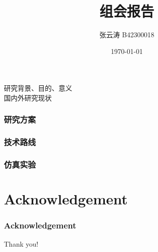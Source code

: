 \documentclass{beamer} %
\title{组会报告}
\author[张云涛]{\noindent 张云涛 B42300018}
\institute[HEU]{
	哈尔滨工程大学
}
\date{\today}
\begin{document}
\frame{\titlepage}

\begin{frame}
	研究背景、目的、意义 \\
	国内外研究现状
	
\end{frame}

\begin{frame}
	\frametitle{研究方案}
	
\end{frame}

\begin{frame}
	\frametitle{技术路线}
\end{frame}


\begin{frame}
	\frametitle{仿真实验}
	
\end{frame}


\section*{Acknowledgement}  
\begin{frame}
	\frametitle{Acknowledgement}
	\textcolor{NJUPurple}{\Huge{\centerline{Thank you!}}}
\end{frame}
\end{document}
